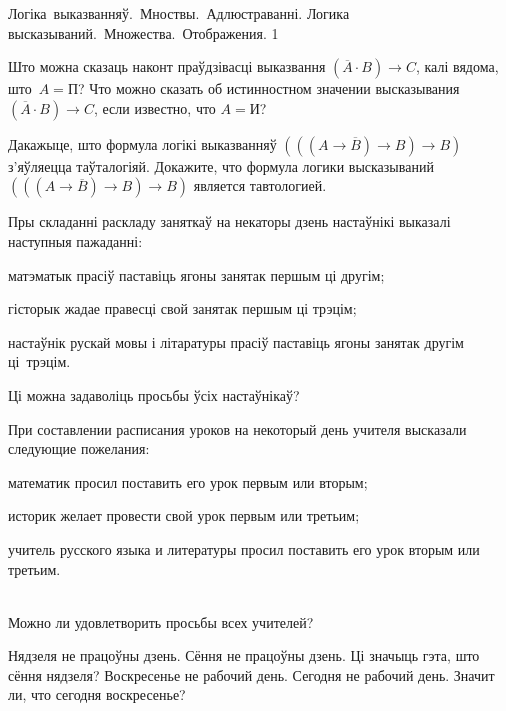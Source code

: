 \documentclass[12pt, a4paper]{article}
\begin{document}
\quizTitle
{Логіка~выказванняў.~Мноствы.~Адлюстраванні.}
{Логика высказываний.~Множества.~Отображения.}
{1}

\begin{problemList}

\problemItemSimple
{Што можна сказаць наконт праўдзівасці выказвання $(\overline{A} \cdot B) \to C$, калі вядома, што~$A = \mbox{П}$?}
{Что можно сказать об истинностном значении высказывания $(\overline{A} \cdot B) \to C$, если известно, что $A = \mbox{И}$?}

\bigskip

\problemItemSimple
{Дакажыце, што формула логікі выказванняў $(((A \to \overline{B}) \to B) \to B)$ з'яўляецца таўталогіяй.}
{Докажите, что формула логики высказываний $(((A \to \overline{B}) \to B) \to B)$ является тавтологией.}

\bigskip

\problemItemSimple
{Пры складанні раскладу заняткаў на некаторы дзень настаўнікі выказалі наступныя пажаданні:
\begin{belarusianEnumerate}
    \item матэматык прасіў паставіць ягоны занятак першым ці другім;
    \item гісторык жадае правесці свой занятак першым ці трэцім;
    \item настаўнік рускай мовы і літаратуры прасіў паставіць ягоны занятак другім ці~трэцім.
\end{belarusianEnumerate}

\vspace{-8pt}
Ці можна задаволіць просьбы ўсіх настаўнікаў?}
{При составлении расписания уроков на некоторый день учителя высказали следующие пожелания:
\begin{russianEnumerate}
    \item математик просил поставить его урок первым или вторым;
    \item историк желает провести свой урок первым или третьим;
    \item учитель русского языка и литературы просил поставить его урок вторым или третьим.
\end{russianEnumerate}\\
Можно ли удовлетворить просьбы всех учителей?}

\bigskip

\problemItemSimple
{Нядзеля не працоўны дзень. Сёння не працоўны дзень. Ці значыць гэта, што сёння нядзеля?}
{Воскресенье не рабочий день. Сегодня не рабочий день. Значит ли, что сегодня воскресенье?}


\end{problemList}
\end{document}
